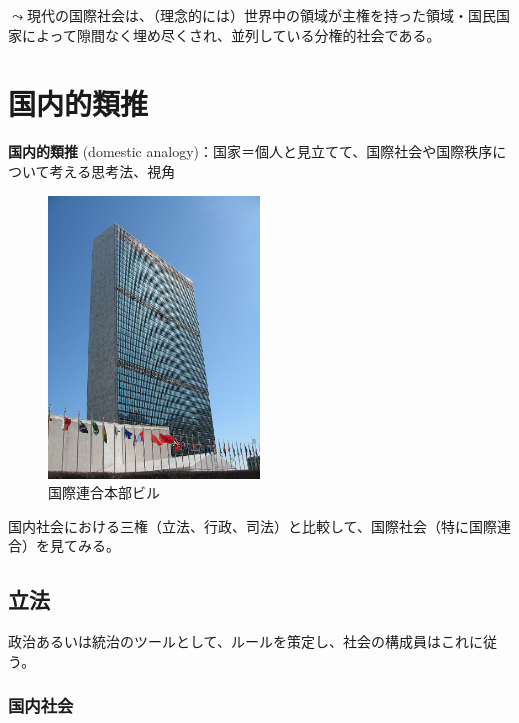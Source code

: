 \documentclass[
  xelatex,
  ja=standard]{bxjsarticle}
\begin{document}
\(\leadsto\)現代の国際社会は、（理念的には）世界中の領域が主権を持った領域・国民国家によって隙間なく埋め尽くされ、並列している分権的社会である。

\hypertarget{ux56fdux5185ux7684ux985eux63a8}{%
\section{国内的類推}\label{ux56fdux5185ux7684ux985eux63a8}}

\textbf{国内的類推} (domestic
analogy)：国家＝個人と見立てて、国際社会や国際秩序について考える思考法、視角\citetext{\citealp[p.174]{nakanishi2013}; \citealp[p.39-46]{shinoda2007}}

\begin{figure}[htpb]

{\centering \includegraphics[width=0.5\textwidth,height=\textheight]{international_society_files/mediabag/800px-UNHQ_NYC.jpg}

}

\caption{国際連合本部ビル}

\end{figure}

国内社会における三権（立法、行政、司法）と比較して、国際社会（特に国際連合）を見てみる。

\hypertarget{ux7acbux6cd5}{%
\subsection{立法}\label{ux7acbux6cd5}}

政治あるいは統治のツールとして、ルールを策定し、社会の構成員はこれに従う。

\hypertarget{ux56fdux5185ux793eux4f1a}{%
\subsubsection{国内社会}\label{ux56fdux5185ux793eux4f1a}}
\end{document}
